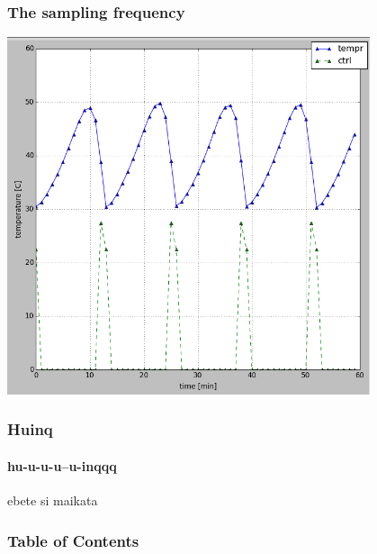 \documentclass{beamer}
\begin{document}
\begin{frame}
\frametitle{The sampling frequency}
\includegraphics[width=0.8\textwidth]{../images/exp_relay_slow}~
\end{frame}

\begin{frame}
\frametitle{Huinq}
\framesubtitle{hu-u-u-u--u-inqqq}
ebete si maikata
\end{frame}

\begin{frame}
\frametitle{Table of Contents}
\tableofcontents
\end{frame}
\end{document}
